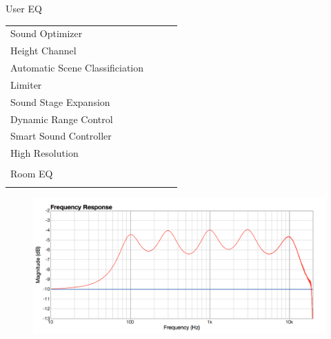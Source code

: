 \documentclass{beamer}
\begin{document}
\begin{frame}[t]{User EQ}
\begin{tiny}
\begin{tabular}{@{}lccc@{}}
				Sound Optimizer & \color{black}{Off} & & \\
				Height Channel & \color{black}{Off} & & \\
				Automatic Scene Classificiation & \color{black}{Off} & & \\
				Limiter & \color{black}{Off} & & \\
				Sound Stage Expansion & \color{black}{Off} & & \\
				Dynamic Range Control & \color{black}{Off} & & \\
				Smart Sound Controller & \color{black}{Off} & & \\
				High Resolution & \color{black}{Off} & & \\
				\color{blue}{User EQ} & \color{blue}{On} & & \\
				Room EQ & \color{black}{Off} & & \\
				\color{blue}{OSD Volume} & \color{blue}{On} &  \color{blue}{Vol.40} & \\
				\midrule
			\end{tabular}
		\end{tiny}
		
		\begin{figure}[b]
			\includegraphics[height=0.32\textwidth]{figure/usereq.png}
		\end{figure}
		
	\end{frame}
	
\end{document}
